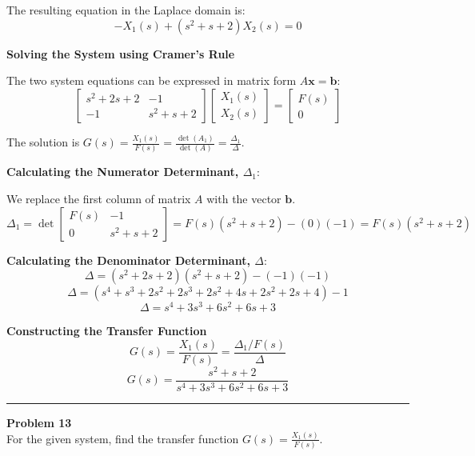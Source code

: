 \documentclass[11pt]{article}
\begin{document}
The resulting equation in the Laplace domain is:
\begin{equation}
-X_1(s) + (s^2 + s + 2)X_2(s) = 0 \tag{2}
\end{equation}

\newpage
\noindent\textbf{Solving the System using Cramer's Rule}
\vspace{12pt}

The two system equations can be expressed in matrix form $A\mathbf{x} = \mathbf{b}$:
$$
\begin{bmatrix}
s^2 + 2s + 2 & -1 \\
-1 & s^2 + s + 2
\end{bmatrix}
\begin{bmatrix}
X_1(s) \\
X_2(s)
\end{bmatrix}
=
\begin{bmatrix}
F(s) \\
0
\end{bmatrix}
$$

The solution is $G(s) = \frac{X_1(s)}{F(s)} = \frac{\det(A_1)}{\det(A)} = \frac{\Delta_1}{\Delta}$.

\vspace{12pt}
\noindent\textbf{Calculating the Numerator Determinant, $\Delta_1$}:
\vspace{12pt}

We replace the first column of matrix $A$ with the vector $\mathbf{b}$.
$$ \Delta_1 = \det
\begin{bmatrix}
F(s) & -1 \\
0 & s^2 + s + 2
\end{bmatrix}
= F(s)(s^2 + s + 2) - (0)(-1) = F(s)(s^2 + s + 2) $$

\vspace{12pt}
\noindent\textbf{Calculating the Denominator Determinant, $\Delta$}:
$$\Delta = (s^2 + 2s + 2)(s^2 + s + 2) - (-1)(-1)$$
$$\Delta = (s^4 + s^3 + 2s^2 + 2s^3 + 2s^2 + 4s + 2s^2 + 2s + 4) - 1$$
$$\Delta = s^4 + 3s^3 + 6s^2 + 6s + 3$$

\vspace{12pt}
\noindent\textbf{Constructing the Transfer Function}
$$G(s) = \frac{X_1(s)}{F(s)} = \frac{\Delta_1 / F(s)}{\Delta}$$
\[
\boxed{
G(s) = \frac{s^2 + s + 2}{s^4 + 3s^3 + 6s^2 + 6s + 3}
}
\]
\newpage
  \setcounter{page}{24}  
\noindent\rule{\textwidth}{1pt}
\noindent\textbf{Problem 13} \hfill 
\\ For the given system, find the transfer function $G(s)=\frac{X_1(s)}{F(s)}$.
\end{document}
